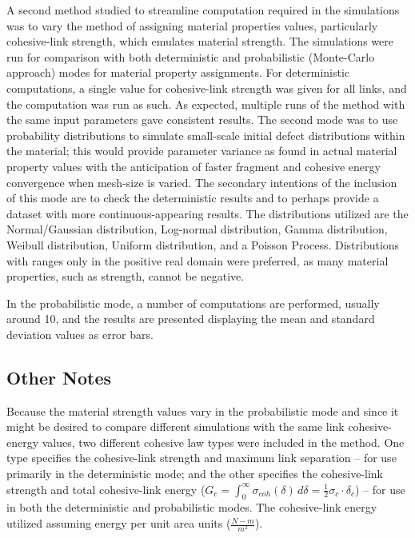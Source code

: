 \documentclass[12pt,a4paper]{article}
\begin{document}
A second method studied to streamline computation required in the simulations was to vary the method of assigning material properties values, particularly cohesive-link strength, which emulates material strength. The simulations were run for comparison with both deterministic and probabilistic (Monte-Carlo approach) modes for material property assignments. For deterministic computations, a single value for cohesive-link strength was given for all links, and the computation was run as such. As expected, multiple runs of the method with the same input parameters gave consistent results. The second mode was to use probability distributions to simulate small-scale initial defect distributions within the material; this would provide parameter variance as found in actual material property values with the anticipation of faster fragment and cohesive energy convergence when mesh-size is varied. The secondary intentions of the inclusion of this mode are to check the deterministic results and to perhaps provide a dataset with more continuous-appearing results. The distributions utilized are the Normal/Gaussian distribution, Log-normal distribution, Gamma distribution, Weibull distribution, Uniform distribution, and a Poisson Process. Distributions with ranges only in the positive real domain were preferred, as many material properties, such as strength, cannot be negative.

In the probabilistic mode, a number of computations are performed, usually around 10, and the results are presented displaying the mean and standard deviation values as error bars.


\subsection{Other Notes}

Because the material strength values vary in the probabilistic mode and since it might be desired to compare different simulations with the same link cohesive-energy values, two different cohesive law types were included in the method. One type specifies the cohesive-link strength and maximum link separation -- for use primarily in the deterministic mode; and the other specifies the cohesive-link strength and total cohesive-link energy ($G_{c} = \int_{0}^{\infty} \! \sigma_{coh}(\delta) \, d\delta = \frac{1}{2} \sigma_{c} \cdot \delta_{c}$) -- for use in both the deterministic and probabilistic modes. The cohesive-link energy utilized assuming energy per unit area units ($\frac{N-m}{m^2}$).
\end{document}
